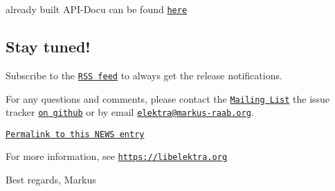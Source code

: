 already built A\+P\+I-\/\+Docu can be found \href{https://doc.libelektra.org/api/0.8.18/html/}{\tt here}

\subsection*{Stay tuned!}

Subscribe to the \href{https://doc.libelektra.org/news/feed.rss}{\tt R\+SS feed} to always get the release notifications.

For any questions and comments, please contact the \href{https://lists.sourceforge.net/lists/listinfo/registry-list}{\tt Mailing List} the issue tracker \href{https://git.libelektra.org/issues}{\tt on github} or by email \href{mailto:elektra@markus-raab.org}{\tt elektra@markus-\/raab.\+org}.

\href{https://doc.libelektra.org/news/190576e0-9fef-486e-b8da-c4e75be08329.html}{\tt Permalink to this N\+E\+WS entry}

For more information, see \href{https://libelektra.org}{\tt https\+://libelektra.\+org}

Best regards, Markus 